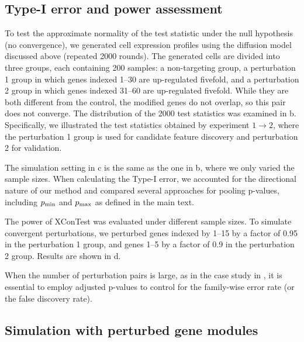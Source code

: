 \documentclass[11pt]{article}
\begin{document}


\subsection*{Type-I error and power assessment}

To test the approximate normality of the test statistic under the null hypothesis (no convergence), we generated cell expression profiles using the diffusion model discussed above (repeated 2000 rounds). The generated cells are divided into three groups, each containing 200 samples: a non-targeting group, a perturbation 1 group in which genes indexed 1–30 are up-regulated fivefold, and a perturbation 2 group in which genes indexed 31–60 are up-regulated fivefold. While they are both different from the control, the modified genes do not overlap, so this pair does not converge.
The distribution of the 2000 test statistics was examined in b. Specifically, we illustrated the test statistics obtained by experiment $1\rightarrow2$, where the perturbation 1 group is used for candidate feature discovery and perturbation 2 for validation.
 
The simulation setting in c is the same as the one in b, where we only varied the sample sizes. When calculating the Type-I error, we accounted for the directional nature of our method and compared several approaches for pooling p-values, including $p_{\rm min}$ and $p_{\rm max}$ as defined in the main text. 

The power of XConTest was evaluated under different sample sizes. To simulate convergent perturbations, we perturbed genes indexed by 1–15 by a factor of 0.95 in the perturbation 1 group, and genes 1–5 by a factor of 0.9 in the perturbation 2 group. Results are shown in d.

When the number of perturbation pairs is large, as in the case study in \cite{yao2024scalable}, it is essential to employ adjusted p-values to control for the family-wise error rate (or the false discovery rate).

\subsection*{Simulation with perturbed gene modules}
\end{document}
